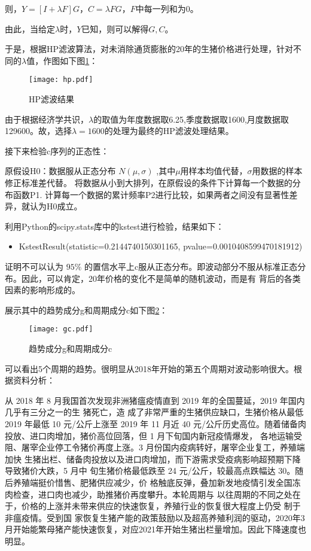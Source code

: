 \documentclass[a4paper,AutoFakeBold,AutoFakeSlant]{ctexart}
\begin{document}
则，$ Y = \left[I + \lambda F\right]G $，$ C = \lambda FG $，$F$中每一列和为0。

由此，当给定$\lambda$时，$Y$已知，则可以解得$G, C$。

于是，根据HP滤波算法，对未消除通货膨胀的20年的生猪价格进行处理，针对不同的$\lambda$值，作图如下图\ref{f5}：

\begin{figure}[H]
  \centering
  \texttt{[image: hp.pdf]}
  \caption{HP滤波结果}
  \label{f5}
\end{figure}

由于根据经济学共识，$\lambda$的取值为年度数据取6.25,季度数据取1600,月度数据取129600。故，选择$\lambda = 1600$的处理为最终的HP滤波处理结果。

接下来检验c序列的正态性：

原假设H0：数据服从正态分布 $N(\mu,\sigma)$ ,其中$\mu$用样本均值代替，$\sigma$用数据的样本修正标准差代替。
将数据从小到大排列，在原假设的条件下计算每一个数据的分布函数P1.
计算每一个数据的累计频率P2进行比较，如果两者之间没有显著性差异，就认为H0成立。

利用Python的scipy.stats库中的kstest进行检验，结果如下：

\begin{itemize}
  \item KstestResult(statistic=0.2144740150301165, pvalue=0.0010408599470181912)
\end{itemize}

证明不可以认为 $95\%$ 的置信水平上c服从正态分布。即波动部分不服从标准正态分布。因此，可以肯定，20年价格的变化不是简单的随机波动，而是有
背后的各类因素的影响形成的。

展示其中的趋势成分g和周期成分c如下图\ref{f6}：
\begin{figure}[H]
  \centering
  \texttt{[image: gc.pdf]}
  \caption{趋势成分g和周期成分c}
  \label{f6}
\end{figure}

可以看出5个周期的趋势。很明显从2018年开始的第五个周期对波动影响很大。根据资料分析：

从 2018 年 8 月我国首次发现非洲猪瘟疫情直到 2019 年的全国蔓延，2019 年国内几乎有三分之一的生
猪死亡，造
成了非常严重的生猪供应缺口，生猪价格从最低 2019 年最低 10 元/公斤上涨至 2019 年 11 月近 40
元/公斤历史高位。随着储备肉投放、进口肉增加，猪价高位回落，但 1 月下旬国内新冠疫情爆发，
各地运输受阻、屠宰企业停工令猪价再度上涨。3 月份国内疫病转好，屠宰企业复工，养殖端加快
生猪出栏、储备肉投放以及进口肉增加，而下游需求受疫病影响超预期下降导致猪价大跌，5 月中
旬生猪价格最低跌至 24 元/公斤，较最高点跌幅达 30。随后养殖端挺价惜售、肥猪供应减少，价
格触底反弹，叠加新发地疫情引发全国冻肉检查，进口肉也减少，助推猪价再度攀升。本轮周期与
以往周期的不同之处在于，价格的上涨并未带来供应的快速恢复，养殖行业的恢复很大程度上仍受
制于非瘟疫情。受到国
家恢复生猪产能的政策鼓励以及超高养殖利润的驱动，2020年3月开始能繁母猪产能快速恢复，对应2021年开始生猪出栏量增加。因此下降速度也明显。
\end{document}
